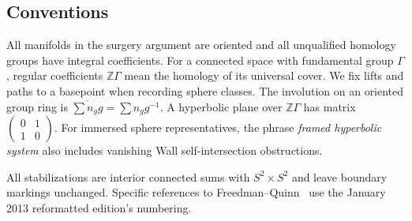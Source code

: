 \documentclass[11pt]{article}
\theoremstyle{definition}
\theoremstyle{remark}
\newcommand{\Z}{\mathbb Z}
\begin{document}
\subsection{Conventions}
All manifolds in the surgery argument are oriented and all unqualified
homology groups have integral coefficients. For a connected space with
fundamental group $\Gamma$, regular coefficients $\Z\Gamma$ mean the
homology of its universal cover. We fix lifts and paths to a basepoint
when recording sphere classes. The involution on an oriented group ring
is $\overline{\sum n_g g}=\sum n_g g^{-1}$.
A hyperbolic plane over $\Z\Gamma$ has matrix
$\left(\begin{smallmatrix}0&1\\1&0\end{smallmatrix}\right)$.
For immersed sphere representatives, the phrase \emph{framed hyperbolic
system} also includes vanishing Wall self-intersection obstructions.

All stabilizations are interior connected sums with $S^2\times S^2$ and
leave boundary markings unchanged. Specific references to
Freedman--Quinn~\cite{FQ} use the January 2013 reformatted edition's
numbering.






{\raggedright}
\end{document}
